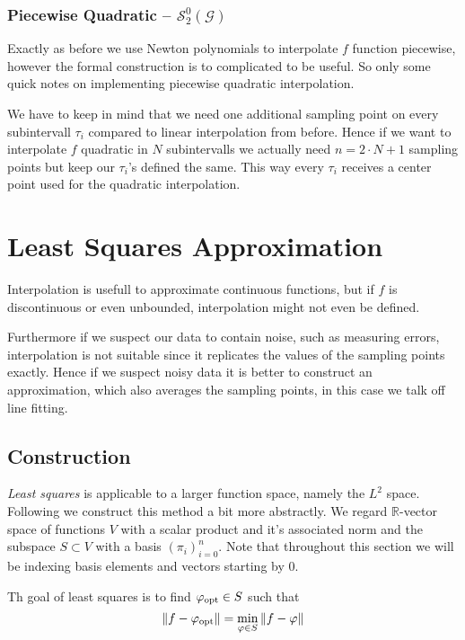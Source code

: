 \subsubsection{Piecewise Quadratic -- \(\mathcal{S}_2^0(\mathcal{G})\)}
Exactly as before we use Newton polynomials to interpolate \(f\) function piecewise, however the formal construction is to complicated to be useful.
So only some quick notes on implementing piecewise quadratic interpolation.

We have to keep in mind that we need one additional sampling point on every subintervall \(\tau_i\) compared to linear interpolation from before.
Hence if we want to interpolate \(f\) quadratic in \(N\) subintervalls we actually need \(n = 2 \cdot N + 1\) sampling points but keep our \(\tau_i\)'s defined the same.
This way every \(\tau_i\) receives a center point used for the quadratic interpolation.



\section{Least Squares Approximation}
Interpolation is usefull to approximate continuous functions, but if \(f\) is discontinuous or even unbounded, interpolation might not even be defined.

Furthermore if we suspect our data to contain noise, such as measuring errors, interpolation is not suitable since it replicates the values of the sampling points exactly.
Hence if we suspect noisy data it is better to construct an approximation, which also averages the sampling points, in this case we talk off line fitting.

\subsection{Construction}
\emph{Least squares} is applicable to a larger function space, namely the \(L^2\) space.
Following we construct this method a bit more abstractly.
We regard \(\mathbb{R}\)-vector space of functions \(V\) with a scalar product and it's associated norm and the subspace \(S \subset V\) with a basis \((\pi_i)_{i=0}^n\).
Note that throughout this section we will be indexing basis elements and vectors starting by 0.

Th goal of least squares is to find \(\varphi_{\operatorname{opt}} \in S\) such that
\[\|f - \varphi_{\operatorname{opt}}\| = \min_{\varphi \in S} \|f - \varphi\|\]

